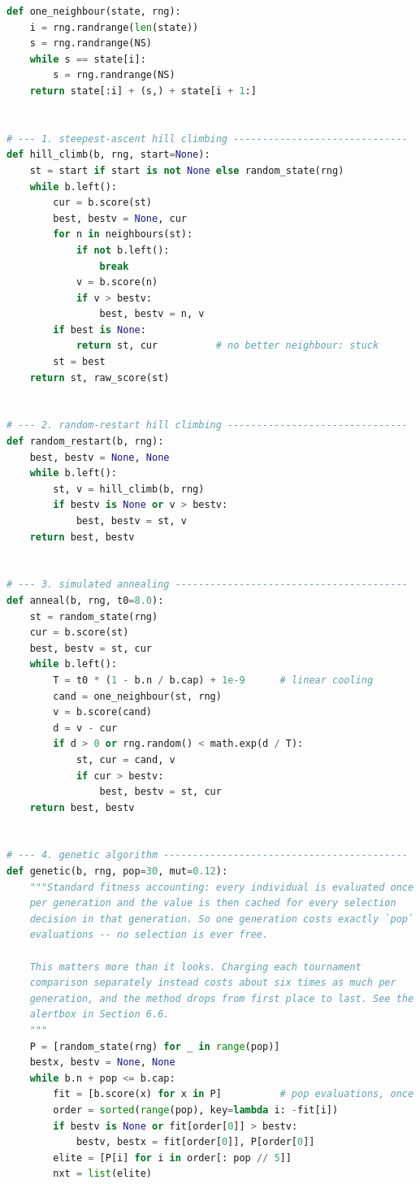 \begin{lab}
\begin{lstlisting}[language=Python]
def one_neighbour(state, rng):
    i = rng.randrange(len(state))
    s = rng.randrange(NS)
    while s == state[i]:
        s = rng.randrange(NS)
    return state[:i] + (s,) + state[i + 1:]


# --- 1. steepest-ascent hill climbing ------------------------------
def hill_climb(b, rng, start=None):
    st = start if start is not None else random_state(rng)
    while b.left():
        cur = b.score(st)
        best, bestv = None, cur
        for n in neighbours(st):
            if not b.left():
                break
            v = b.score(n)
            if v > bestv:
                best, bestv = n, v
        if best is None:
            return st, cur          # no better neighbour: stuck
        st = best
    return st, raw_score(st)


# --- 2. random-restart hill climbing -------------------------------
def random_restart(b, rng):
    best, bestv = None, None
    while b.left():
        st, v = hill_climb(b, rng)
        if bestv is None or v > bestv:
            best, bestv = st, v
    return best, bestv


# --- 3. simulated annealing ----------------------------------------
def anneal(b, rng, t0=8.0):
    st = random_state(rng)
    cur = b.score(st)
    best, bestv = st, cur
    while b.left():
        T = t0 * (1 - b.n / b.cap) + 1e-9      # linear cooling
        cand = one_neighbour(st, rng)
        v = b.score(cand)
        d = v - cur
        if d > 0 or rng.random() < math.exp(d / T):
            st, cur = cand, v
            if cur > bestv:
                best, bestv = st, cur
    return best, bestv


# --- 4. genetic algorithm ------------------------------------------
def genetic(b, rng, pop=30, mut=0.12):
    """Standard fitness accounting: every individual is evaluated once
    per generation and the value is then cached for every selection
    decision in that generation. So one generation costs exactly `pop`
    evaluations -- no selection is ever free.

    This matters more than it looks. Charging each tournament
    comparison separately instead costs about six times as much per
    generation, and the method drops from first place to last. See the
    alertbox in Section 6.6.
    """
    P = [random_state(rng) for _ in range(pop)]
    bestx, bestv = None, None
    while b.n + pop <= b.cap:
        fit = [b.score(x) for x in P]          # pop evaluations, once
        order = sorted(range(pop), key=lambda i: -fit[i])
        if bestv is None or fit[order[0]] > bestv:
            bestv, bestx = fit[order[0]], P[order[0]]
        elite = [P[i] for i in order[: pop // 5]]
        nxt = list(elite)


\end{lstlisting}
\end{lab}
